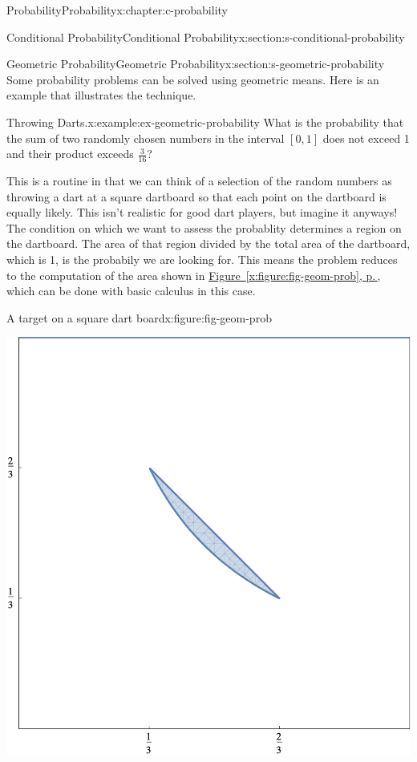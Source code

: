 \documentclass[twoside,10pt,]{book}
\newcommand{\xreffont}{\relax}
\numberwithin{equation}{section}
\begin{document}
\begin{chapterptx}{Probability}{}{Probability}{}{}{x:chapter:c-probability}
\begin{sectionptx}{Conditional Probability}{}{Conditional Probability}{}{}{x:section:s-conditional-probability}
\end{sectionptx}
%
%
\typeout{************************************************}
\typeout{************************************************}
%
\begin{sectionptx}{Geometric Probability}{}{Geometric Probability}{}{}{x:section:s-geometric-probability}
Some probability problems can be solved using geometric means. Here is an example that illustrates the technique.%
\begin{example}{Throwing Darts.}{x:example:ex-geometric-probability}%
What is the probability that the sum of two randomly chosen numbers in the interval \([0, 1]\) does not exceed 1 and their product exceeds \(\frac{3}{16}\)?%
\par
This is a routine in that we can think of a selection of the random numbers as throwing a dart at a square dartboard so that each point on the dartboard is equally likely.  This isn't realistic for good dart players, but imagine it anyways!  The condition on which  we want to assess the probablity determines a region on the dartboard.  The area of that region divided by the total area of the dartboard, which is 1, is the probabily we are looking for.   This means the problem reduces to the computation of the area shown in \hyperref[x:figure:fig-geom-prob]{Figure~{\xreffont\ref{x:figure:fig-geom-prob}}, p.\,\pageref{x:figure:fig-geom-prob}}, which can be done with basic calculus in this case.%
\begin{figureptx}{A target on a square dart board}{x:figure:fig-geom-prob}{}%
\begin{image}{0.2}{0.6}{0.2}%
\includegraphics[width=\linewidth]{images/fig-geom-prob.png}

\end{image}
\end{figureptx}
\end{example}
\end{sectionptx}
\end{chapterptx}
\end{document}
